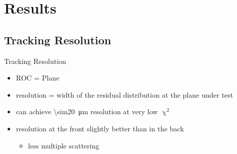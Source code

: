 \section{Results}
\subsection{Tracking Resolution}
\begin{frame}{Tracking Resolution}

	
	\begin{itemize}\itemfill
		\item ROC = Plane
		\item resolution = width of the residual distribution at the plane under test
		\item can achieve \SI{\sim20}{\micro\meter} resolution at very low $\upchi^2$
		\item resolution at the front slightly better than in the back
		\begin{itemize}
			\item less multiple scattering
		\end{itemize}

	\end{itemize}
		
\end{frame}
